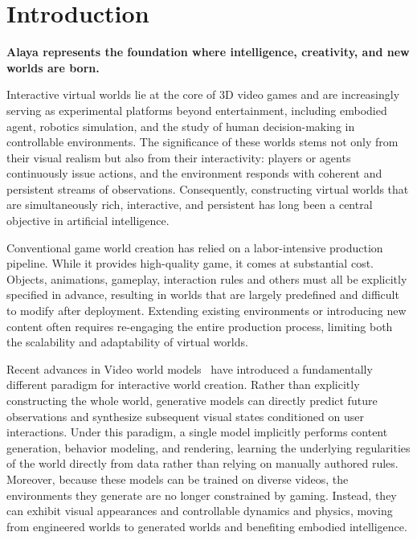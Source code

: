 \section{Introduction}

\textbf{Alaya represents the foundation where intelligence, creativity, and new worlds are born.}

Interactive virtual worlds lie at the core of 3D video games and are increasingly serving as experimental platforms beyond entertainment, including embodied agent, robotics simulation, and the study of human decision-making in controllable environments.
The significance of these worlds stems not only from their visual realism but also from their interactivity: players or agents continuously issue actions, and the environment responds with coherent and persistent streams of observations.
Consequently, constructing virtual worlds that are simultaneously rich, interactive, and persistent has long been a central objective in artificial intelligence.

Conventional game world creation has relied on a labor-intensive production pipeline.
While it provides high-quality game, it comes at substantial cost. Objects, animations, gameplay, interaction rules and others must all be explicitly specified in advance, resulting in worlds that are largely predefined and difficult to modify after deployment. Extending existing environments or introducing new content often requires re-engaging the entire production process, limiting both the scalability and adaptability of virtual worlds.

Recent advances in Video world models~\cite{alibaba2026happyoyster, ball2025genie3, echo2026joyai, Mao_2026_CVPR, mao2025yume, team2026advancing, hunyuanvideo2025, wang2026matrix, yuan2026helios, zhu2026sana} have introduced a fundamentally different paradigm for interactive world creation.
Rather than explicitly constructing the whole world, generative models can directly predict future observations and synthesize subsequent visual states conditioned on user interactions.
Under this paradigm, a single model implicitly performs content generation, behavior modeling, and rendering, learning the underlying regularities of the world directly from data rather than relying on manually authored rules.
Moreover, because these models can be trained on diverse videos, the environments they generate are no longer constrained by gaming.
Instead, they can exhibit visual appearances and controllable dynamics and physics, moving from engineered worlds to generated worlds and benefiting embodied intelligence.


